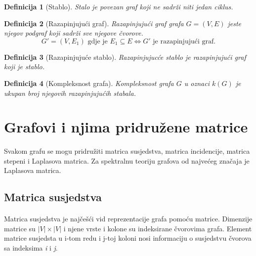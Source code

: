 \documentclass[11pt]{article}
\newtheorem{definition}{Definicija}
\begin{document}
		\begin{definition}[Stablo]
		Stalo je povezan graf koji ne sadrži niti jedan ciklus.
		\end{definition}
	
		\begin{definition}[Razapinjujući graf]
		Razapinjujući graf grafa $G = (V,E)$ jeste njegov podgraf koji sadrži sve njegove čvorove.
		\[
			G' = (V, E_1) \text{ gdje je } E_1 \subseteq E \Leftrightarrow G' \text{ je razapinjujući graf}.
		\]
		\end{definition}
	
		\begin{definition}[Razapinjujuće stablo]
		Razapinjujucće stablo je razapinjujući graf koji je stablo.
		\end{definition}
	
		\begin{definition}[Kompleksnost grafa]
		Kompleksnost grafa $G$ u oznaci $k(G)$ je ukupan broj njegovih razapinjujućih stabala. 
		\end{definition}
	
	\section{Grafovi i njima pridružene matrice}
	\paragraph{}
	Svakom grafu se mogu pridružiti matrica susjedstva, matrica incidencije, matrica stepeni i Laplasova matrica.
	Za spektralnu teoriju grafova od najvećeg značaja je Laplasova matrica.
	
		\subsection{Matrica susjedstva}
		\paragraph{}
		Matrica susjedstva je najčešći vid reprezentacije grafa pomoću matrice. 
		Dimenzije matrice su $|V| \times |V|$ i njene vrste i kolone su indeksirane čvorovima grafa.  
		Element matrice susjedsta u i-tom redu i j-toj koloni nosi informaciju o susjedstvu čvorova sa indeksima \emph{i} i \emph{j}.
	
\end{document}
